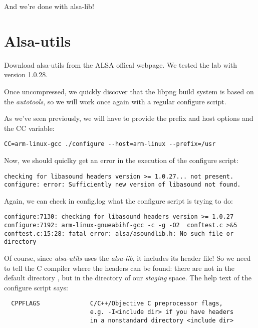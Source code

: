 And we're done with alsa-lib!

\section{Alsa-utils}

Download alsa-utils from the ALSA offical webpage. We tested the lab
with version 1.0.28.

Once uncompressed, we quickly discover that the libpng build system is
based on the {\em autotools}, so we will work once again with a
regular configure script.

As we've seen previously, we will have to provide the prefix and host
options and the CC variable:

\begin{verbatim}
CC=arm-linux-gcc ./configure --host=arm-linux --prefix=/usr
\end{verbatim}

Now, we should quiclky get an error in the execution of the configure
script:

\begin{verbatim}
checking for libasound headers version >= 1.0.27... not present.
configure: error: Sufficiently new version of libasound not found.
\end{verbatim}

Again, we can check in config.log what the configure script is trying
to do:

\footnotesize
\begin{verbatim}
configure:7130: checking for libasound headers version >= 1.0.27
configure:7192: arm-linux-gnueabihf-gcc -c -g -O2  conftest.c >&5
conftest.c:15:28: fatal error: alsa/asoundlib.h: No such file or directory
\end{verbatim}
\normalsize

Of course, since {\em alsa-utils} uses the {\em alsa-lib}, it includes
its header file! So we need to tell the C compiler where the headers
can be found: there are not in the default directory
, but in the  directory of our
{\em staging} space. The help text of the configure script says:

\begin{verbatim}
  CPPFLAGS              C/C++/Objective C preprocessor flags,
                        e.g. -I<include dir> if you have headers
                        in a nonstandard directory <include dir>
\end{verbatim}


